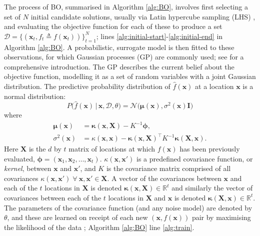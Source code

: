 \documentclass[conference]{IEEEtran}
\newcommand{\evaluatedx}{\bX}
\newcommand{\ninitialevaluations}{N}
\newcommand{\nevaluations}{t}
\newcommand{\ndim}{d}
\newcommand\gp{GP\xspace}
\newcommand{\given}{\,|\,}
\newcommand{\bx}{\mathbf{x}}
\newcommand{\bX}{\mathbf{X}}
\newcommand{\bI}{\mathbf{I}}
\newcommand{\bmu}{\boldsymbol{\mu}}
\newcommand{\bphi}{\boldsymbol{\phi}}
\begin{document}
The process of BO, summarised in Algorithm \ref{alg:BO}, involves first selecting a set of $\ninitialevaluations$ initial candidate solutions, usually via Latin hypercube sampling (LHS) \cite{mckay2000comparison}, and evaluating the objective function for each of these to produce a set $\mathcal{D} = \{ (\bx_t, f_t \triangleq f(\bx_t) )\}_{t=1}^{\ninitialevaluations}$; lines \ref{alg:initial-start}-\ref{alg:initial-end} in Algorithm \ref{alg:BO}. A probabilistic, surrogate model is then fitted to these observations, for which  Gaussian processes (\gp) are commonly used; see \cite{rasmussen2003gaussian} for a comprehensive introduction.
The \gp describes the current belief about the objective function, modelling it as a set of random variables with a joint Gaussian distribution.  The predictive probability distribution of $\hat{f}(\bx)$ at a location $\bx$ is a normal distribution:
\begin{equation}\label{eqn: P(f_t+1)}
P\big(\hat{f}(\mathbf{x}) \given \mathbf{x}, \mathcal{D}, \theta \big) = 
\mathcal{N}\big(\bmu(\mathbf{x}), \sigma^2(\mathbf{x})\bI\big)
\end{equation}
where
\begin{align}\label{eqn: mu}
\bmu(\mathbf{x}) &= \boldsymbol{\kappa}(\mathbf{x}, \evaluatedx) - K^{-1}  \bphi,\\
\label{eqn: sigma}
\sigma^2(\mathbf{x}) &= \kappa(\mathbf{x}, \mathbf{x}) - \boldsymbol{\kappa}(\mathbf{x}, \evaluatedx)^{\top}K^{-1} \boldsymbol{\kappa}(\evaluatedx, \mathbf{x}).
\end{align}
Here $\evaluatedx$ is the $\ndim$ by $\nevaluations$ matrix of locations at which $f(\bx)$ has
been previously evaluated, $\bphi = (\bx_1, \bx_2, \ldots, \bx_{\nevaluations})$.
$\kappa(\mathbf{x}, \mathbf{x}')$ is a predefined
covariance function, or  \textit{kernel}, between $\mathbf{x}$ and
$\mathbf{x}'$, and  $K$ is the covariance matrix comprised of all
covariances $\kappa(\mathbf{x}, \mathbf{x}') \; \forall \: \mathbf{x},
\mathbf{x}'\in \evaluatedx$. A vector of the covariances between
$\mathbf{x}$ and each of the $t$ locations in $\evaluatedx$ is denoted
$\boldsymbol{\kappa}(\mathbf{x}, \evaluatedx)\in \mathbb{R}^{t}$ and
similarly the vector of covariances between each of the $t$ locations in
$\evaluatedx$ and $\mathbf{x}$ is denoted $\boldsymbol{\kappa}(\evaluatedx,
\mathbf{x}) \in \mathbb{R}^{t}$. The parameters of the covariance function
(and any noise model) are denoted by $\theta$, and these are learned on receipt of each new $(\bx, f(\bx))$ pair by maximising the likelihood of the data \cite{rasmussen2003gaussian}; Algorithm \ref{alg:BO} line \ref{alg:train}. 
\end{document}
